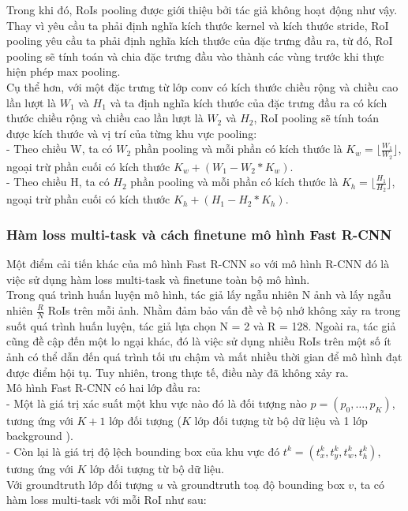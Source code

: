 {    \noindent
    Trong khi đó, RoIs pooling được giới thiệu bởi tác giả không hoạt động như vậy.
    Thay vì yêu cầu ta phải định nghĩa kích thước kernel và kích thước stride, RoI pooling yêu cầu ta phải định nghĩa kích thước của đặc trưng đầu ra, từ đó, RoI pooling sẽ tính toán và chia đặc trưng đầu vào thành các vùng trước khi thực hiện phép max pooling. \\
    Cụ thể hơn, với một đặc trưng từ lớp conv có kích thước chiều rộng và chiều cao lần lượt là ${W}_{1}$ và ${H}_{1}$ và ta định nghĩa kích thước của đặc trưng đầu ra có kích thước chiều rộng và chiều cao lần lượt là ${W}_{2}$ và ${H}_{2}$, RoI pooling sẽ tính toán được kích thước và vị trí của từng khu vực pooling: \\
    - Theo chiều W, ta có ${W}_{2}$ phần pooling và mỗi phần có kích thước là ${K}_{w} = \lfloor\frac{{W}_{1}}{{W}_{2}}\rfloor$, ngoại trừ phần cuối có kích thước ${K}_{w} + ({W}_{1} - {W}_{2} * {K}_{w})$. \\
    - Theo chiều H, ta có ${H}_{2}$ phần pooling và mỗi phần có kích thước là ${K}_{h} = \lfloor\frac{{H}_{1}}{{H}_{2}}\rfloor$, ngoại trừ phần cuối có kích thước ${K}_{h} + ({H}_{1} - {H}_{2} * {K}_{h})$. \\

    \subsubsection{Hàm loss multi-task và cách finetune mô hình Fast R-CNN}
    Một điểm cải tiến khác của mô hình Fast R-CNN so với mô hình R-CNN đó là việc sử dụng hàm loss multi-task và finetune toàn bộ mô hình. \\
    Trong quá trình huấn luyện mô hình, tác giả lấy ngẫu nhiên N ảnh và lấy ngẫu nhiên $\frac{R}{N}$ RoIs trên mỗi ảnh.
    Nhằm đảm bảo vấn đề về bộ nhớ không xảy ra trong suốt quá trình huấn luyện, tác giả lựa chọn N = 2 và R = 128.
    Ngoài ra, tác giả cũng đề cập đến một lo ngại khác, đó là việc sử dụng nhiều RoIs trên một số ít ảnh có thể dẫn đến quá trình tối ưu chậm và mất nhiều thời gian để mô hình đạt được điểm hội tụ.
    Tuy nhiên, trong thực tế, điều này đã không xảy ra. \\
    Mô hình Fast R-CNN có hai lớp đầu ra: \\
    - Một là giá trị xác suất một khu vực nào đó là đối tượng nào $p = (p_0, \dots, p_K)$, tương ứng với $K + 1$ lớp đối tượng  ($K$ lớp đối tượng  từ bộ dữ liệu và 1 lớp background ). \\
    - Còn lại là giá trị độ lệch bounding box  của khu vực đó $t^{k} = (t^{k}_{x}, t^{k}_{y}, t^{k}_{w}, t^{k}_{h})$, tương ứng với $K$ lớp đối tượng  từ bộ dữ liệu. \\
    Với groundtruth  lớp đối tượng  $u$ và groundtruth  toạ độ bounding box  $v$, ta có hàm loss multi-task với mỗi RoI như sau:

}
